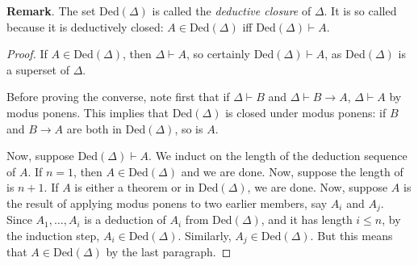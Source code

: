 \documentclass[12pt]{article}
\begin{document}
\textbf{Remark}.  The set Ded$(\Delta)$ is called the \emph{deductive closure} of $\Delta$.  It is so called because it is deductively closed: $A\in \mbox{Ded}(\Delta)$ iff Ded$(\Delta) \vdash A$.
\begin{proof}  If $A\in \mbox{Ded}(\Delta)$, then $\Delta \vdash A$, so certainly Ded$(\Delta) \vdash A$, as Ded$(\Delta)$ is a superset of $\Delta$.  

Before proving the converse, note first that if $\Delta \vdash B$ and $\Delta\vdash B\to A$, $\Delta\vdash A$ by modus ponens.  This implies that Ded$(\Delta)$ is closed under modus ponens: if $B$ and $B\to A$ are both in Ded$(\Delta)$, so is $A$.

Now, suppose Ded$(\Delta) \vdash A$.  We induct on the length of the deduction sequence of $A$.  If $n=1$, then $A\in \mbox{Ded}(\Delta)$ and we are done.  Now, suppose the length of is $n+1$.  If $A$ is either a theorem or in Ded$(\Delta)$, we are done.  Now, suppose $A$ is the result of applying modus ponens to two earlier members, say $A_i$ and $A_j$.  Since $A_1,\ldots, A_i$ is a deduction of $A_i$ from Ded$(\Delta)$, and it has length $i\le n$, by the induction step, $A_i\in \mbox{Ded}(\Delta)$.  Similarly, $A_j \in \mbox{Ded}(\Delta)$.  But this means that $A\in \mbox{Ded}(\Delta)$ by the last paragraph.
\end{proof}

\end{document}
